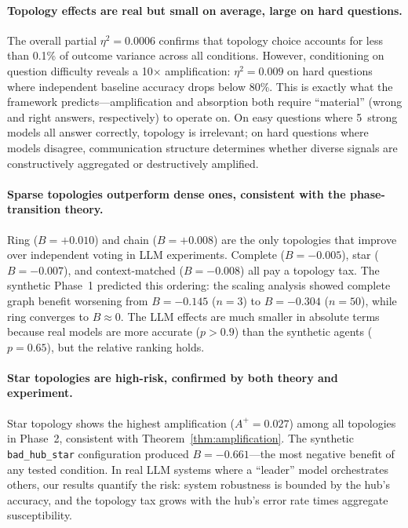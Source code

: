 \documentclass{article}
\begin{document}
\paragraph{Topology effects are real but small on average, large on hard questions.}
The overall partial $\eta^2 = 0.0006$ confirms that topology choice accounts for less than 0.1\% of outcome variance across all conditions. However, conditioning on question difficulty reveals a 10$\times$ amplification: $\eta^2 = 0.009$ on hard questions where independent baseline accuracy drops below 80\%. This is exactly what the framework predicts---amplification and absorption both require ``material'' (wrong and right answers, respectively) to operate on. On easy questions where 5~strong models all answer correctly, topology is irrelevant; on hard questions where models disagree, communication structure determines whether diverse signals are constructively aggregated or destructively amplified.

\paragraph{Sparse topologies outperform dense ones, consistent with the phase-transition theory.}
Ring ($B = +0.010$) and chain ($B = +0.008$) are the only topologies that improve over independent voting in LLM experiments. Complete ($B = -0.005$), star ($B = -0.007$), and context-matched ($B = -0.008$) all pay a topology tax. The synthetic Phase~1 predicted this ordering: the scaling analysis showed complete graph benefit worsening from $B = -0.145$ ($n = 3$) to $B = -0.304$ ($n = 50$), while ring converges to $B \approx 0$. The LLM effects are much smaller in absolute terms because real models are more accurate ($p > 0.9$) than the synthetic agents ($p = 0.65$), but the relative ranking holds.

\paragraph{Star topologies are high-risk, confirmed by both theory and experiment.}
Star topology shows the highest amplification ($A^+ = 0.027$) among all topologies in Phase~2, consistent with Theorem~\ref{thm:amplification}. The synthetic \texttt{bad\_hub\_star} configuration produced $B = -0.661$---the most negative benefit of any tested condition. In real LLM systems where a ``leader'' model orchestrates others, our results quantify the risk: system robustness is bounded by the hub's accuracy, and the topology tax grows with the hub's error rate times aggregate susceptibility.
\end{document}
